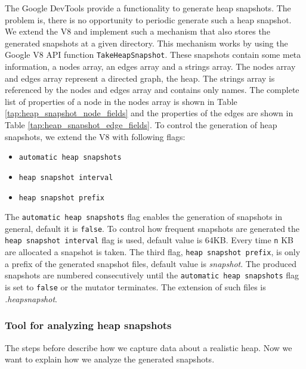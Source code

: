 The Google DevTools \cite{DevTools} provide a functionality to generate heap snapshots. The problem is, there is no opportunity to periodic generate such a heap snapshot. We extend the V8 and implement such a mechanism that also stores the generated snapshots at a given directory. This mechanism works by using the Google V8 API function \texttt{TakeHeapSnapshot}. These snapshots contain some meta information, a nodes array, an edges array and a strings array. The nodes array and edges array represent a directed graph, the heap. The strings array is referenced by the nodes and edges array and contains only names. The complete list of properties of a node in the nodes array is shown in Table \ref{tap:heap_snapshot_node_fields} and the properties of the edges are shown in Table \ref{tap:heap_snapshot_edge_fields}. To control the generation of heap snapshots, we extend the V8 with following flags:
\begin{itemize}
	\item \texttt{automatic heap snapshots}
	\item \texttt{heap snapshot interval}
	\item \texttt{heap snapshot prefix} 
\end{itemize}	
The \texttt{automatic heap snapshots} flag enables the generation of snapshots in general, default it is \texttt{false}. To control how frequent snapshots are generated the \texttt{heap snapshot interval} flag is used, default value is 64KB. Every time \texttt{n} KB are allocated a snapshot is taken. The third flag, \texttt{heap snapshot prefix}, is only a prefix of the generated snapshot files, default value is \textit{snapshot}. The produced snapshots are numbered consecutively until the \texttt{automatic heap snapshots} flag is set to \texttt{false} or the mutator terminates. The extension of such files is \textit{.heapsnapshot}. 


\subsubsection{Tool for analyzing heap snapshots} \label{sec:heap_snapshot_analyzer}
The steps before describe how we capture data about a realistic \JS heap. Now we want to explain how we analyze the generated snapshots. 

